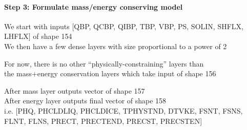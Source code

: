 \documentclass[11pt]{article}
\begin{document}
    \hypertarget{step-3-formulate-massenergy-conserving-model}{%
\paragraph{Step 3: Formulate mass/energy conserving
model}\label{step-3-formulate-massenergy-conserving-model}}

We start with inputs {[}QBP, QCBP, QIBP, TBP, VBP, PS, SOLIN, SHFLX,
LHFLX{]} of shape 154\\
We then have a few dense layers with size proportional to a power of 2

For now, there is no other ``physically-constraining'' layers than\\
the mass+energy conservation layers which take input of shape 156

After mass layer outputs vector of shape 157\\
After energy layer outputs final vector of shape 158\\
i.e. {[}PHQ, PHCLDLIQ, PHCLDICE, TPHYSTND, DTVKE, FSNT, FSNS, FLNT,
FLNS, PRECT, PRECTEND, PRECST, PRECSTEN{]}
\end{document}

